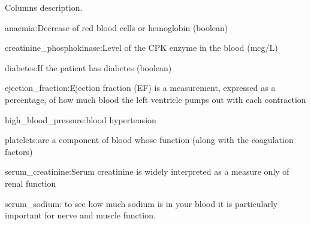 Columns description.


\begin{DoxyEnumerate}
\item anaemia\+:Decrease of red blood cells or hemoglobin (boolean)
\item creatinine\+\_\+phosphokinase\+:Level of the CPK enzyme in the blood (mcg/L)
\item diabetes\+:If the patient has diabetes (boolean)
\item ejection\+\_\+fraction\+:Ejection fraction (EF) is a measurement, expressed as a percentage, of how much blood the left ventricle pumps out with each contraction
\item high\+\_\+blood\+\_\+pressure\+:blood hypertension
\item platelets\+:are a component of blood whose function (along with the coagulation factors)
\item serum\+\_\+creatinine\+:Serum creatinine is widely interpreted as a measure only of renal function
\item serum\+\_\+sodium\+: to see how much sodium is in your blood it is particularly important for nerve and muscle function. 
\end{DoxyEnumerate}